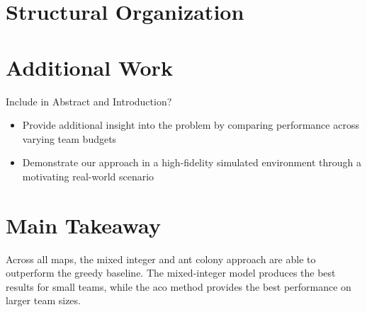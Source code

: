 \documentclass[11pt,a4paper,twoside]{article}
\begin{document}
\section*{Structural Organization}
\section*{Additional Work}

Include in Abstract and Introduction?
\begin{itemize}
    \item Provide additional insight into the problem by comparing performance across varying team budgets
    \item Demonstrate our approach in a high-fidelity simulated environment through a motivating real-world scenario
\end{itemize}

\section*{Main Takeaway}

Across all maps, the mixed integer and ant colony approach are able to outperform the greedy baseline. The mixed-integer model produces the best results for small teams, while the aco method provides the best performance on larger team sizes. 
\end{document}
